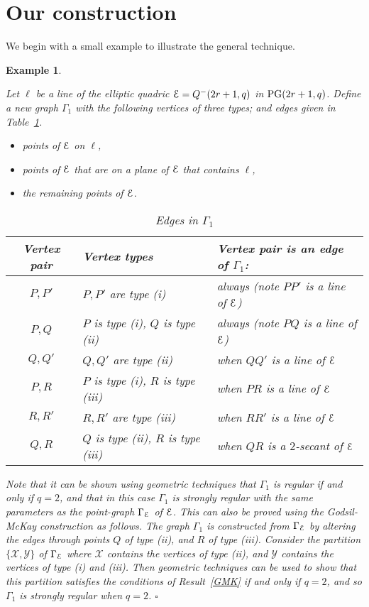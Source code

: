 \documentclass[12pt]{article}
\newtheorem{example}[theorem]{Example}
\newcommand{\X}{\mathcal X}
\newcommand{\Y}{\mathcal Y}
\newcommand\E{{\cal E}}
\newcommand\PG{{\rm PG}}
\newcommand{\Label}{\label}
\begin{document}
\section{Our construction}\Label{sec:const}

We begin with a small example 
to illustrate the general technique. 

\begin{example}\Label{example} {\rm 
 Let $\ell$ be a line of the elliptic quadric  $\E=Q^-(2r+1,q)$ in $\PG(2r+1,q)$.
Define a new graph $\Gamma_1$ with the following vertices of three types; and edges given in  Table~\ref{table-edges}.
\begin{itemize}
\item[(i)] points of $\E$ on $\ell$, 
\item[(ii)] points of $\E$ that are on a plane of $\E$ that contains $\ell$, 
\item[(iii)] the  remaining points of $\E$.
\end{itemize}
 
  \begin{table}[h]
  \caption{Edges in $\Gamma_1$}\label{table-edges}
\begin{center}
\begin{tabular}{|c|l|l|}
\hline
Vertex pair & Vertex types &  Vertex pair  is an edge of $\Gamma_1$: \\
\hline
 $P,P'$  & $P,P'$ are type (i)&always (note $PP'$ is a line of $\E$)\\
 $P,Q$ &  $P$ is type (i), $Q$ is type (ii)& always (note $PQ$ is a line of $\E$)\\
 $Q,Q'$ & $Q,Q'$ are type (ii)&  when $QQ'$ is a line of $\E$\\
 $P,R$ & $P$ is type (i), $R$ is type (iii)&  when $PR$ is a line of $\E$\\
 $R,R'$ & $R,R'$ are type (iii)&   when $RR'$ is a line of $\E$\\
 $Q,R$ & $Q$ is type (ii), $R$ is type (iii)&  when  $QR$ is a $2$-secant of $\E$\\ \hline
 \end{tabular}
\end{center} \end{table}


Note that it can be shown  using geometric techniques that $\Gamma_1$ is regular if and only if $q=2$, and that in this case $\Gamma_1$ is strongly regular with the same parameters as the point-graph $\Gamma_\E$ of $\E$. This can also be proved using  the Godsil-McKay construction as follows.
The graph $\Gamma_1$ is constructed from  $\Gamma_\E$  by altering the edges through points $Q$ of type (ii), and $R$ of type (iii). Consider the partition $\{\X,\Y\}$ of $\Gamma_\E$ where $\X$ contains the vertices of type (ii), and $\Y$ contains the vertices of type (i) and (iii). Then geometric techniques can be used to show that this partition satisfies the conditions of Result~\ref{GMK} if and only if $q=2$, and so $\Gamma_1$ is strongly regular when $q=2$.   \hfill$\square$} \end{example}
\end{document}
